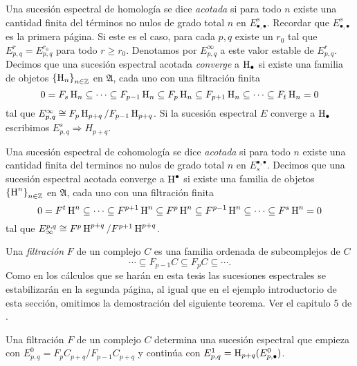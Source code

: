 \documentclass[a4paper,oneside,fleqn,11pt,../tesis.tex]{subfiles}
\begin{document}
\begin{definition}
    Una sucesión espectral de homología  se dice \emph{acotada} si para todo $n$ existe una cantidad finita del términos no nulos de grado total
    $n$ en $E^{s}_{\bullet,\bullet}$. Recordar que $E^{s}_{\bullet,\bullet}$ es la primera página. Si este es el caso, para cada $p, q$ existe 
    un $r_0$ tal que $E_{p, q}^{r} = E_{p, q}^{r_0}$ para todo $r \geq r_0$.
    Denotamos por $E_{p, q}^{\infty}$ a este valor estable de $E_{p, q}^{r}$. Decimos que una sucesión espectral acotada \emph{converge}
    a $\operatorname{H}_{\bullet}$ si existe una familia de objetos $\left\lbrace \operatorname{H}_{n} \right\rbrace_{n \in \mathbb{Z}}$ en $\mathfrak{A}$, cada uno con una
    filtración finita
    \[
        0 = F_s \operatorname{H}_n \subseteq \cdots \subseteq F_{p - 1}\operatorname{H}_n \subseteq
            F_{p}\operatorname{H}_n \subseteq F_{p + 1}\operatorname{H}_n \subseteq \cdots \subseteq F_t \operatorname{H}_n = 0
    \]
    tal que $E_{p, q}^{\infty} \cong F_{p}\operatorname{H}_{p + q} / F_{p - 1} \operatorname{H}_{p + q}$. Si la sucesión espectral $E$ converge a $\operatorname{H}_{\bullet}$
    escribimos $E_{p, q}^{s} \Rightarrow H_{p + q}$.
    
    Una sucesión espectral de cohomología  se dice \emph{acotada} si para todo $n$ existe una cantidad finita del terminos no nulos de grado total
    $n$ en $E_{s}^{\bullet,\bullet}$. Decimos que una sucesión espectral acotada converge a $\operatorname{H}^{\bullet}$ si existe una familia de objetos 
    $\left\lbrace \operatorname{H}^{n} \right\rbrace_{n \in \mathbb{Z}}$ en $\mathfrak{A}$, cada uno con una
    filtración finita
    \[
        0 = F^t \operatorname{H}^n \subseteq \cdots \subseteq F^{p + 1}\operatorname{H}^n \subseteq
            F^{p}\operatorname{H}^n \subseteq F^{p - 1}\operatorname{H}^n \subseteq \cdots \subseteq F^s \operatorname{H}^n = 0
    \]
    tal que $E^{p, q}_{\infty} \cong F^{p}\operatorname{H}^{p + q} / F^{p + 1} \operatorname{H}^{p + q}$.
\end{definition}

$ $\\
Una \emph{filtración} $F$ de un complejo $C$ es una familia ordenada de subcomplejos de  $C$
\[
        \cdots \subseteq F_{p - 1}C \subseteq F_{p}C \subseteq \cdots .
\]
Como en los cálculos que se harán en esta
tesis las sucesiones espectrales se estabilizarán en la segunda página, al igual que en el ejemplo introductorio de esta sección,
omitimos la demostración del siguiente teorema. Ver el capitulo 5 de \cite{We}.

\begin{Teorema} Una filtración $F$ de un complejo $C$ determina una sucesión espectral que empieza con
$E_{p, q}^{0} = F_{p} C_{p + q} / F_{p - 1}C_{p + q}$ y continúa con $E_{p, q}^{1} = \operatorname{H}_{p + q}(E_{p, \bullet}^{0})$.
\end{Teorema}
\end{document}
